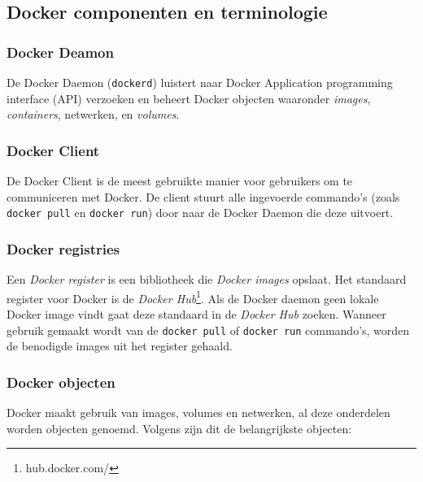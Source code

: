 \subsection{Docker componenten en terminologie}

\subsubsection{Docker Deamon}De Docker Daemon (\verb|dockerd|) luistert naar Docker Application programming interface (API) verzoeken en beheert Docker objecten waaronder \textit{images}, \textit{containers}, netwerken, en \textit{volumes}.

\subsubsection{Docker Client}De Docker Client is de meest gebruikte manier voor gebruikers om te communiceren met Docker. De client stuurt alle ingevoerde commando's (zoals \verb|docker pull| en \verb|docker run|) door naar de Docker Daemon die deze uitvoert.

\subsubsection{Docker registries} \label{registry}
Een \textit{Docker register} is een bibliotheek die \textit{Docker images} opslaat. Het standaard register voor Docker is de \textit{Docker Hub}\footnote{hub.docker.com/}. Als de Docker daemon geen lokale Docker image vindt gaat deze standaard in de \textit{Docker Hub} zoeken. Wanneer gebruik gemaakt wordt van de \verb|docker pull| of \verb|docker run| commando's, worden de benodigde images uit het register gehaald.

\subsubsection{Docker objecten} \label{dockerObjects}
Docker maakt gebruik van images, volumes en netwerken, al deze onderdelen worden objecten genoemd. Volgens \textcite{Docker2021a, AquaSecurity2021} zijn dit de belangrijkste objecten:

